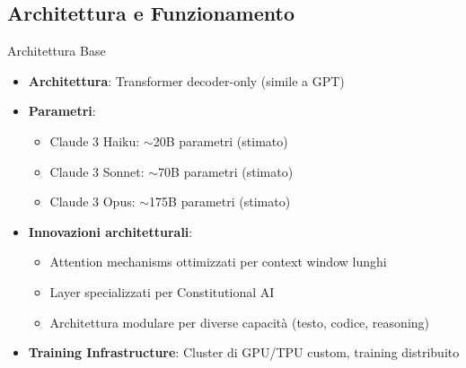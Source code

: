 \documentclass[aspectratio=169]{beamer}
\begin{document}
\subsection{Architettura e Funzionamento}
%
%
\begin{frame}{Architettura Base}
\begin{itemize}
    \item \textbf{Architettura}: Transformer decoder-only (simile a GPT)
    \item \textbf{Parametri}: 
    \begin{itemize}
        \item Claude 3 Haiku: $\sim$20B parametri (stimato)
        \item Claude 3 Sonnet: $\sim$70B parametri (stimato)
        \item Claude 3 Opus: $\sim$175B parametri (stimato)
    \end{itemize}
    \item \textbf{Innovazioni architetturali}:
    \begin{itemize}
        \item Attention mechanisms ottimizzati per context window lunghi
        \item Layer specializzati per Constitutional AI
        \item Architettura modulare per diverse capacità (testo, codice, reasoning)
    \end{itemize}
    \item \textbf{Training Infrastructure}: Cluster di GPU/TPU custom, training distribuito
\end{itemize}
\end{frame}
%
%
\end{document}
